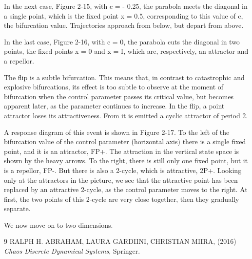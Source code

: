 \documentclass[12pt]{article}
\begin{document}
\hfill

In the next case, Figure 2-15, with c = - 0.25, the parabola
meets the diagonal in a single point, which is the fixed point x = 0.5,
corresponding to this value of c, the bifurcation value. Trajectories
approach from below, but depart from above.

\hfill

In the last case, Figure 2-16, with c = 0, the parabola cuts the
diagonal in two points, the fixed points x = 0 and x = I, which are,
respectively, an attractor and a repellor.

\hfill

The flip is a subtle bifurcation. This means that, in contrast to
catastrophic and explosive bifurcations, its effect is too subtle to
observe at the moment of bifurcation when the control parameter
passes its critical value, but becomes apparent later, as the parameter
continues to increase. In the flip, a point attractor loses its
attractiveness. From it is emitted a cyclic attractor of period 2.

\hfill

A response diagram of this event is shown in Figure 2-17. To
the left of the bifurcation value of the control parameter (horizontal
axis) there is a single fixed point, and it is an attractor, FP+. The
attraction in the vertical state space is shown by the heavy arrows.
To the right, there is still only one fixed point, but it is a repellor,
FP-. But there is also a 2-cycle, which is attractive, 2P+. Looking
only at the attractors in the picture, we see that the attractive point
has been replaced by an attractive 2-cycle, as the control parameter
moves to the right. At first, the two points of this 2-cycle are very
close together, then they gradually separate.

We now move on to two dimensions.

\begin{thebibliography}{9}
RALPH H. ABRAHAM, LAURA GARDIINI, CHRISTIAN MIIRA, (2016) \emph{Chaos Discrete Dynamical Systems}, Springer.

\end{thebibliography}
\end{document}
